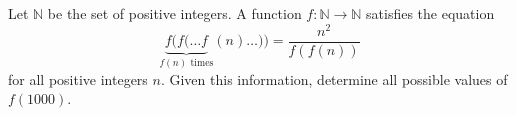 Let $\mathbb{N}$ be the set of positive integers. A function $f:\mathbb{N}\to\mathbb{N}$ satisfies the equation \[\underbrace{f(f(\ldots f}_{f(n)\text{ times}}(n)\ldots))=\frac{n^2}{f(f(n))}\]for all positive integers $n$. Given this information, determine all possible values of $f(1000)$.
